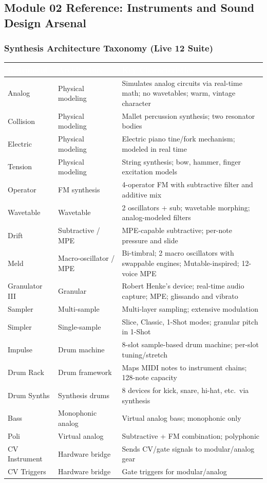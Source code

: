\documentclass[11pt,letterpaper]{article}
\newcommand{\tableheader}[1]{\textbf{\sffamily\textcolor{white}{#1}}}
\begin{document}
\subsection{Module 02 Reference: Instruments and Sound Design Arsenal}

\subsubsection{Synthesis Architecture Taxonomy (Live 12 Suite)}

\begin{center}
\begin{tabularx}{\textwidth}{L{2.5cm}L{3cm}X}
\toprule
{}
\tableheader{Instrument} & \tableheader{Architecture} & \tableheader{Key Characteristics} \\
\midrule
Analog & Physical modeling & Simulates analog circuits via real-time math; no wavetables; warm, vintage character \\
Collision & Physical modeling & Mallet percussion synthesis; two resonator bodies \\
Electric & Physical modeling & Electric piano tine/fork mechanism; modeled in real time \\
Tension & Physical modeling & String synthesis; bow, hammer, finger excitation models \\
Operator & FM synthesis & 4-operator FM with subtractive filter and additive mix \\
Wavetable & Wavetable & 2 oscillators + sub; wavetable morphing; analog-modeled filters \\
Drift & Subtractive / MPE & MPE-capable subtractive; per-note pressure and slide \\
Meld & Macro-oscillator / MPE & Bi-timbral; 2 macro oscillators with swappable engines; Mutable-inspired; 12-voice MPE \\
Granulator III & Granular & Robert Henke's device; real-time audio capture; MPE; glissando and vibrato \\
Sampler & Multi-sample & Multi-layer sampling; extensive modulation \\
Simpler & Single-sample & Slice, Classic, 1-Shot modes; granular pitch in 1-Shot \\
Impulse & Drum machine & 8-slot sample-based drum machine; per-slot tuning/stretch \\
Drum Rack & Drum framework & Maps MIDI notes to instrument chains; 128-note capacity \\
Drum Synths & Synthesis drums & 8 devices for kick, snare, hi-hat, etc.\ via synthesis \\
Bass & Monophonic analog & Virtual analog bass; monophonic only \\
Poli & Virtual analog & Subtractive + FM combination; polyphonic \\
CV Instrument & Hardware bridge & Sends CV/gate signals to modular/analog gear \\
CV Triggers & Hardware bridge & Gate triggers for modular/analog \\
\bottomrule
\end{tabularx}
\end{center}
\end{document}
